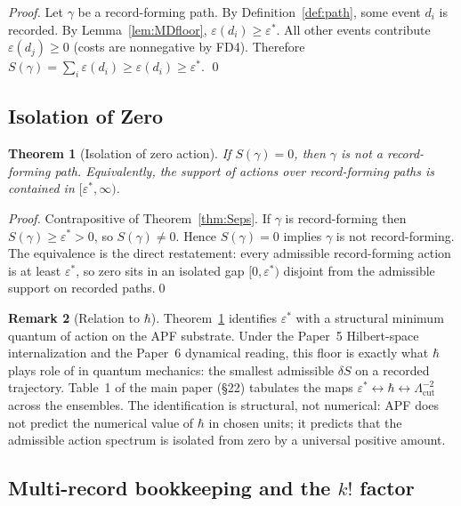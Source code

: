 \documentclass[11pt,a4paper]{article}
\newtheorem{theorem}{Theorem}[section]
\theoremstyle{definition}
\newtheorem{remark}[theorem]{Remark}
\newcommand{\eps}{\varepsilon}
\newcommand{\epsstar}{\varepsilon^{\ast}}
\begin{document}
\begin{proof}
Let $\gamma$ be a record-forming path.  By Definition~\ref{def:path}, some event $d_i$ is recorded.  By Lemma~\ref{lem:MDfloor}, $\eps(d_i)\geq\epsstar$.  All other events contribute $\eps(d_j)\geq 0$ (costs are nonnegative by FD4).  Therefore $S(\gamma)=\sum_i\eps(d_i)\geq\eps(d_i)\geq\epsstar$. \qed
\end{proof}

\subsection{Isolation of Zero}

\begin{theorem}[Isolation of zero action]
\label{thm:IsoZero}
If $S(\gamma)=0$, then $\gamma$ is not a record-forming path.  Equivalently, the support of actions over record-forming paths is contained in $[\epsstar,\infty)$.
\end{theorem}

\begin{proof}
Contrapositive of Theorem~\ref{thm:Seps}.  If $\gamma$ is record-forming then $S(\gamma)\geq\epsstar>0$, so $S(\gamma)\neq 0$.  Hence $S(\gamma)=0$ implies $\gamma$ is not record-forming.  The equivalence is the direct restatement: every admissible record-forming action is at least $\epsstar$, so zero sits in an isolated gap $[0,\epsstar)$ disjoint from the admissible support on recorded paths.\qed
\end{proof}

\begin{remark}[Relation to $\hbar$]
\label{rem:hbar}
Theorem~\ref{thm:IsoZero} identifies $\epsstar$ with a structural minimum quantum of action on the APF substrate.  Under the Paper~5 Hilbert-space internalization and the Paper~6 dynamical reading, this floor is exactly what $\hbar$ plays role of in quantum mechanics: the smallest admissible $\delta S$ on a recorded trajectory.  Table~1 of the main paper (§22) tabulates the maps $\epsstar\leftrightarrow\hbar\leftrightarrow\Lambda_{\mathrm{cut}}^{-2}$ across the ensembles.  The identification is structural, not numerical: APF does not predict the numerical value of $\hbar$ in chosen units; it predicts that the admissible action spectrum is isolated from zero by a universal positive amount.
\end{remark}

\subsection{Multi-record bookkeeping and the $k!$ factor}
\end{document}

